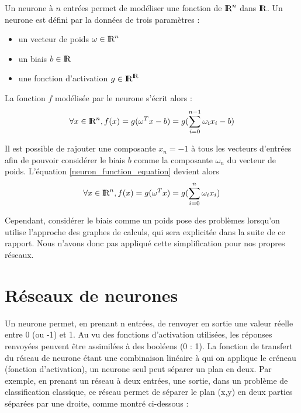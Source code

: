 \begin{definition}[Neurone] 
Un neurone à $n$ entrées permet de modéliser une fonction de $\textrm{I\kern-0.21emR}^n$ dans $\textrm{I\kern-0.21emR}$. Un neurone est défini par la données de trois paramètres :
  \begin{itemize}
    \item un vecteur de poids $\omega \in \textrm{I\kern-0.21emR}^n$
    \item un biais $b \in \textrm{I\kern-0.21emR}$
    \item une fonction d'activation $g \in \textrm{I\kern-0.21emR}^{\textrm{I\kern-0.21emR}}$
  \end{itemize}

La fonction $f$ modélisée par le neurone s'écrit alors : 
  \begin{equation}
\forall x \in \textrm{I\kern-0.21emR}^n, f(x) = g(\omega^{T}x - b) = g(\sum_{i=0}^{n-1}\omega_{i}x_{i} - b)
  \label{neuron_function_equation}
  \end{equation}
\end{definition}    
\begin{remark}[Biais]
Il est possible de rajouter une composante $x_{n} = -1$ à tous les vecteurs d'entrées afin de pouvoir considérer le biais $b$ comme la composante $\omega_n$ du vecteur de poids. L'équation \eqref{neuron_function_equation} devient alors
  \begin{equation}
\forall x \in \textrm{I\kern-0.21emR}^n, f(x) = g(\omega^{T}x) = g(\sum_{i=0}^{n}\omega_{i}x_{i})  
  \label{corrected_neuron_function_equation}
  \end{equation}

Cependant, considérer le biais comme un poids pose des problèmes lorsqu'on utilise l'approche des graphes de calculs, qui sera explicitée dans la suite de ce rapport. Nous n'avons donc pas appliqué cette simplification pour nos propres réseaux.

\end{remark}

\section{Réseaux de neurones}

Un neurone permet, en prenant n entrées, de renvoyer en sortie une valeur réelle entre 0 (ou -1) et 1. Au vu des fonctions d'activation utilisées, les réponses renvoyées peuvent être assimilées à des booléens (0 : 1). La fonction de transfert du réseau de neurone étant une combinaison linéaire à qui on applique le créneau (fonction d'activation), un neurone seul peut séparer un plan en deux. 
Par exemple, en prenant un réseau à deux entrées, une sortie, dans un problème de classification classique, ce réseau permet de séparer le plan (x,y) en deux parties séparées par une droite, comme montré ci-dessous :

